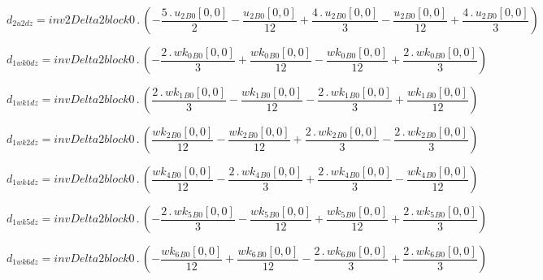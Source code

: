 \documentclass{article}
\begin{document}
\begin{dmath}d_{2 u2 dz} = inv2Delta2block0 \,.\, \left(- \frac{5 \,.\, {u_{2}{_{B0}}}[{0,0}]}{2} - \frac{{u_{2}{_{B0}}}[{0,0}]}{12} + \frac{4 \,.\, {u_{2}{_{B0}}}[{0,0}]}{3} - \frac{{u_{2}{_{B0}}}[{0,0}]}{12} + \frac{4 \,.\, 
{u_{2}{_{B0}}}[{0,0}]}{3}\right)\end{dmath}

\begin{dmath}d_{1 wk0 dz} = invDelta2block0 \,.\, \left(- \frac{2 \,.\, {wk_{0}{_{B0}}}[{0,0}]}{3} + \frac{{wk_{0}{_{B0}}}[{0,0}]}{12} - \frac{{wk_{0}{_{B0}}}[{0,0}]}{12} + \frac{2 \,.\, {wk_{0}{_{B0}}}[{0,0}]}{3}\right)\end{dmath}

\begin{dmath}d_{1 wk1 dz} = invDelta2block0 \,.\, \left(\frac{2 \,.\, {wk_{1}{_{B0}}}[{0,0}]}{3} - \frac{{wk_{1}{_{B0}}}[{0,0}]}{12} - \frac{2 \,.\, {wk_{1}{_{B0}}}[{0,0}]}{3} + \frac{{wk_{1}{_{B0}}}[{0,0}]}{12}\right)\end{dmath}

\begin{dmath}d_{1 wk2 dz} = invDelta2block0 \,.\, \left(\frac{{wk_{2}{_{B0}}}[{0,0}]}{12} - \frac{{wk_{2}{_{B0}}}[{0,0}]}{12} + \frac{2 \,.\, {wk_{2}{_{B0}}}[{0,0}]}{3} - \frac{2 \,.\, {wk_{2}{_{B0}}}[{0,0}]}{3}\right)\end{dmath}

\begin{dmath}d_{1 wk4 dz} = invDelta2block0 \,.\, \left(\frac{{wk_{4}{_{B0}}}[{0,0}]}{12} - \frac{2 \,.\, {wk_{4}{_{B0}}}[{0,0}]}{3} + \frac{2 \,.\, {wk_{4}{_{B0}}}[{0,0}]}{3} - \frac{{wk_{4}{_{B0}}}[{0,0}]}{12}\right)\end{dmath}

\begin{dmath}d_{1 wk5 dz} = invDelta2block0 \,.\, \left(- \frac{2 \,.\, {wk_{5}{_{B0}}}[{0,0}]}{3} - \frac{{wk_{5}{_{B0}}}[{0,0}]}{12} + \frac{{wk_{5}{_{B0}}}[{0,0}]}{12} + \frac{2 \,.\, {wk_{5}{_{B0}}}[{0,0}]}{3}\right)\end{dmath}

\begin{dmath}d_{1 wk6 dz} = invDelta2block0 \,.\, \left(- \frac{{wk_{6}{_{B0}}}[{0,0}]}{12} + \frac{{wk_{6}{_{B0}}}[{0,0}]}{12} - \frac{2 \,.\, {wk_{6}{_{B0}}}[{0,0}]}{3} + \frac{2 \,.\, {wk_{6}{_{B0}}}[{0,0}]}{3}\right)\end{dmath}
\end{document}
